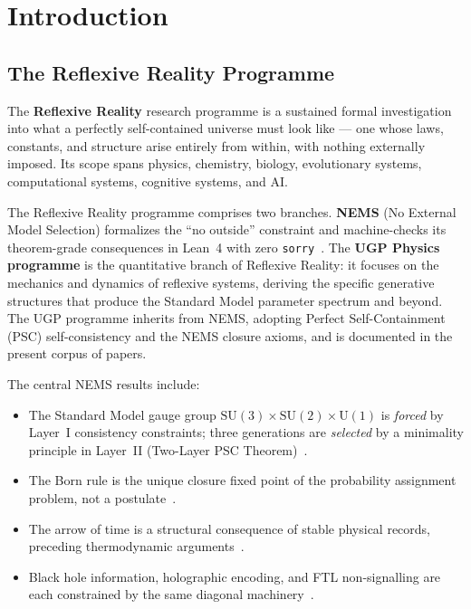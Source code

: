 \documentclass[11pt]{article}
\begin{document}
\newpage
\tableofcontents

\section{Introduction}

\subsection{The Reflexive Reality Programme}

The \textbf{Reflexive Reality} research programme is a sustained formal investigation
into what a perfectly self-contained universe must look like --- one whose laws,
constants, and structure arise entirely from within, with nothing externally imposed.
Its scope spans physics, chemistry, biology, evolutionary systems, computational
systems, cognitive systems, and AI.

The Reflexive Reality programme comprises two branches.  \textbf{NEMS} (No External
Model Selection) formalizes the ``no outside'' constraint and machine-checks its
theorem-grade consequences in Lean~4 with zero \texttt{sorry}~\cite{SpivackNEMSHub}.
The \textbf{UGP Physics programme} is the quantitative branch of Reflexive Reality: it focuses on the
mechanics and dynamics of reflexive systems, deriving the specific generative
structures that produce the Standard Model parameter spectrum and beyond.  The UGP
programme inherits from NEMS, adopting Perfect Self-Containment (PSC) self-consistency and the NEMS closure
axioms, and is documented in the present corpus of papers.

The central NEMS results include:

\begin{itemize}[leftmargin=1.5em,itemsep=0.15em]
  \item The Standard Model gauge group $\mathrm{SU}(3)\times\mathrm{SU}(2)\times\mathrm{U}(1)$ is \emph{forced} by Layer~I
  consistency constraints; three generations are \emph{selected} by a minimality principle in Layer~II (Two-Layer PSC Theorem)~\cite{SpivackNEMS05}.
  \item The Born rule is the unique closure fixed point of the probability assignment problem, not a postulate~\cite{SpivackNEMS88}.
  \item The arrow of time is a structural consequence of stable physical records, preceding thermodynamic arguments~\cite{SpivackNEMS88}.
  \item Black hole information, holographic encoding, and FTL non-signalling are each constrained by the same diagonal machinery~\cite{SpivackNEMS88}.
\end{itemize}
\end{document}
